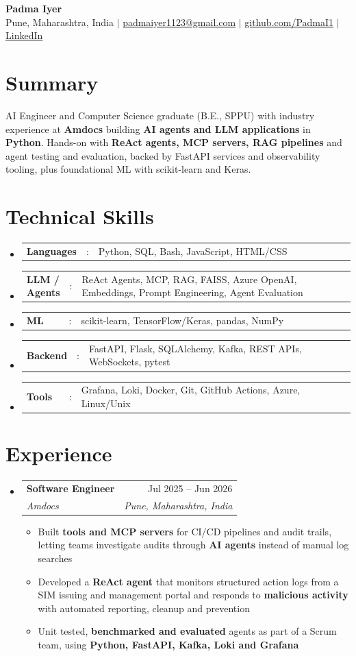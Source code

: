 \documentclass[a4paper,11pt]{article}
\makeatletter
\newcommand{\resumeItem}[1]{
  \item\small{#1}
}
\newcommand{\resumeItemListStart}{\begin{itemize}[leftmargin=0.18in, rightmargin=0.11in]}
\newcommand{\resumeItemListEnd}{\end{itemize}\vspace{3pt}}
\newcommand{\resumeSectionType}[3]{
  \item\small{\begin{tabular*}{0.97\textwidth}[t]{
    p{0.13\linewidth}p{0.02\linewidth}p{0.85\linewidth}
  }
    \textbf{#1} & #2 & #3
  \end{tabular*}}
}
\newcommand{\resumeQuadHeading}[4]{
  \item
  \begin{tabular*}{0.97\textwidth}[t]{l@{\extracolsep{\fill}}r}
    \textbf{#1} & #2 \\
    \textit{\small#3} & \textit{\small #4} \\
  \end{tabular*}
}
\newcommand{\resumeHeadingListStart}{
  \begin{itemize}[leftmargin=0.1in, label={}]
}
\newcommand{\resumeHeadingListEnd}{\end{itemize}}
\makeatother
\begin{document}
\begin{center}
  {\Huge\textbf{Padma Iyer}} \\ \vspace{4pt}
  \small
  Pune, Maharashtra, India $|$
  \href{mailto:padmaiyer1123@gmail.com}{\uline{padmaiyer1123@gmail.com}} $|$
  \href{https://github.com/PadmaI1}{\uline{github.com/PadmaI1}} $|$
  \href{https://www.linkedin.com/in/padma-i-99083922b}{\uline{LinkedIn}}
\end{center}
\vspace{-6pt}


\section{Summary}
\small{
  AI Engineer and Computer Science graduate (B.E., SPPU) with industry experience at \textbf{Amdocs} building \textbf{AI agents and LLM applications} in \textbf{Python}. Hands-on with \textbf{ReAct agents, MCP servers, RAG pipelines} and agent testing and evaluation, backed by FastAPI services and observability tooling, plus foundational ML with scikit-learn and Keras.
}


\section{Technical Skills}
  \resumeHeadingListStart{}
    \resumeSectionType{Languages}{:}{Python, SQL, Bash, JavaScript, HTML/CSS}
    \resumeSectionType{LLM / Agents}{:}{ReAct Agents, MCP, RAG, FAISS, Azure OpenAI, Embeddings, Prompt Engineering, Agent Evaluation}
    \resumeSectionType{ML}{:}{scikit-learn, TensorFlow/Keras, pandas, NumPy}
    \resumeSectionType{Backend}{:}{FastAPI, Flask, SQLAlchemy, Kafka, REST APIs, WebSockets, pytest}
    \resumeSectionType{Tools}{:}{Grafana, Loki, Docker, Git, GitHub Actions, Azure, Linux/Unix}
  \resumeHeadingListEnd{}


\section{Experience}
\resumeHeadingListStart{}
  \resumeQuadHeading{Software Engineer}{Jul 2025 -- Jun 2026}
  {Amdocs}{Pune, Maharashtra, India}
    \resumeItemListStart{}
      \resumeItem{Built \textbf{tools and MCP servers} for CI/CD pipelines and audit trails, letting teams investigate audits through \textbf{AI agents} instead of manual log searches}
      \resumeItem{Developed a \textbf{ReAct agent} that monitors structured action logs from a SIM issuing and management portal and responds to \textbf{malicious activity} with automated reporting, cleanup and prevention}
      \resumeItem{Unit tested, \textbf{benchmarked and evaluated} agents as part of a Scrum team, using \textbf{Python, FastAPI, Kafka, Loki and Grafana}}
    \resumeItemListEnd{}
\resumeHeadingListEnd{}
\end{document}

